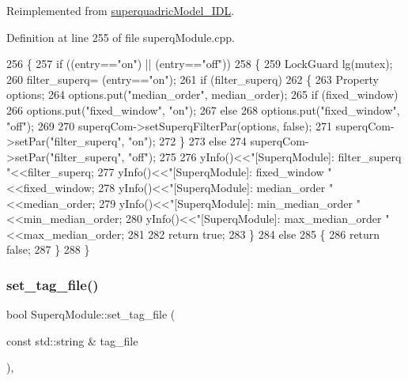 Reimplemented from \mbox{\hyperlink{classsuperquadricModel__IDL_af418edf09afd9374c5272d018c58e8a7}{superquadric\+Model\+\_\+\+I\+DL}}.



Definition at line 255 of file superq\+Module.\+cpp.


\begin{DoxyCode}
256 \{
257     \textcolor{keywordflow}{if} ((entry==\textcolor{stringliteral}{"on"}) || (entry==\textcolor{stringliteral}{"off"}))
258     \{
259         LockGuard lg(mutex);
260         filter_superq= (entry==\textcolor{stringliteral}{"on"});
261         \textcolor{keywordflow}{if} (filter_superq)
262         \{
263             Property options;
264             options.put(\textcolor{stringliteral}{"median\_order"}, median_order);
265             \textcolor{keywordflow}{if} (fixed_window)
266                 options.put(\textcolor{stringliteral}{"fixed\_window"}, \textcolor{stringliteral}{"on"});
267             \textcolor{keywordflow}{else}
268                 options.put(\textcolor{stringliteral}{"fixed\_window"}, \textcolor{stringliteral}{"off"});
269 
270             superqCom->setSuperqFilterPar(options, \textcolor{keyword}{false});
271             superqCom->setPar(\textcolor{stringliteral}{"filter\_superq"}, \textcolor{stringliteral}{"on"});
272         \}
273         \textcolor{keywordflow}{else}
274             superqCom->setPar(\textcolor{stringliteral}{"filter\_superq"}, \textcolor{stringliteral}{"off"});
275 
276         yInfo()<<\textcolor{stringliteral}{"[SuperqModule]: filter\_superq         "}<<filter_superq;
277         yInfo()<<\textcolor{stringliteral}{"[SuperqModule]: fixed\_window          "}<<fixed_window;
278         yInfo()<<\textcolor{stringliteral}{"[SuperqModule]: median\_order          "}<<median_order;
279         yInfo()<<\textcolor{stringliteral}{"[SuperqModule]: min\_median\_order      "}<<min_median_order;
280         yInfo()<<\textcolor{stringliteral}{"[SuperqModule]: max\_median\_order      "}<<max_median_order;
281 
282         \textcolor{keywordflow}{return} \textcolor{keyword}{true};        
283     \}
284     \textcolor{keywordflow}{else}
285     \{
286         \textcolor{keywordflow}{return} \textcolor{keyword}{false};
287     \}
288 \}
\end{DoxyCode}
\mbox{\label{classSuperqModule_ae9f0cfead2c367e4c3aa25292b5c42c6}} 
\subsubsection{\texorpdfstring{set\+\_\+tag\+\_\+file()}{set\_tag\_file()}}
{\footnotesize\ttfamily bool Superq\+Module\+::set\+\_\+tag\+\_\+file (\begin{DoxyParamCaption}\item[{const std\+::string \&}]{tag\+\_\+file }\end{DoxyParamCaption})\hspace{0.3cm}{\ttfamily [protected]}, {\ttfamily [virtual]}}



